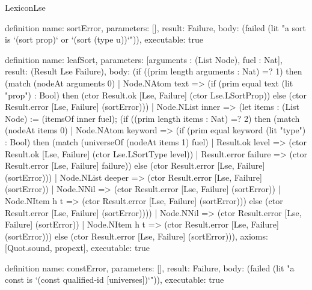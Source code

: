 \begin{lexlean}{LexiconLse}
\begin{semanticmodule}
definition{
  name: sortError,
  parameters: [],
  result: Failure,
  body: (failed (lit "a sort is `(sort prop)` or `(sort (type u))`")),
  executable: true
}

definition{
  name: leafSort,
  parameters: [arguments : (List Node), fuel : Nat],
  result: (Result Lse Failure),
  body: (if ((prim length arguments : Nat) =? 1) then (match (nodeAt arguments 0)
    | Node.NAtom text => (if (prim equal text (lit "prop") : Bool) then (ctor Result.ok [Lse, Failure] (ctor Lse.LSortProp)) else (ctor Result.error [Lse, Failure] (sortError)))
    | Node.NList inner => (let items : (List Node) := (itemsOf inner fuel); (if ((prim length items : Nat) =? 2) then (match (nodeAt items 0)
      | Node.NAtom keyword => (if (prim equal keyword (lit "type") : Bool) then (match (universeOf (nodeAt items 1) fuel)
        | Result.ok level => (ctor Result.ok [Lse, Failure] (ctor Lse.LSortType level))
        | Result.error failure => (ctor Result.error [Lse, Failure] failure)) else (ctor Result.error [Lse, Failure] (sortError)))
      | Node.NList deeper => (ctor Result.error [Lse, Failure] (sortError))
      | Node.NNil => (ctor Result.error [Lse, Failure] (sortError))
      | Node.NItem h t => (ctor Result.error [Lse, Failure] (sortError))) else (ctor Result.error [Lse, Failure] (sortError))))
    | Node.NNil => (ctor Result.error [Lse, Failure] (sortError))
    | Node.NItem h t => (ctor Result.error [Lse, Failure] (sortError))) else (ctor Result.error [Lse, Failure] (sortError))),
  axioms: [Quot.sound, propext],
  executable: true
}

definition{
  name: constError,
  parameters: [],
  result: Failure,
  body: (failed (lit "a const is `(const qualified-id [universes])`")),
  executable: true
}


\end{semanticmodule}
\end{lexlean}
